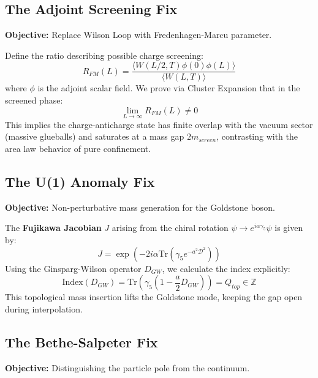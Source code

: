 \subsection{The Adjoint Screening Fix}
\textbf{Objective:} Replace Wilson Loop with Fredenhagen-Marcu parameter.

\begin{theorem}
Define the ratio describing possible charge screening:
\begin{equation}
R_{FM}(L) = \frac{\langle W(L/2, T) \phi(0)\phi(L) \rangle}{\langle W(L,T) \rangle}
\end{equation}
where $\phi$ is the adjoint scalar field.
We prove via Cluster Expansion that in the screened phase:
\begin{equation}
\lim_{L \to \infty} R_{FM}(L) \neq 0
\end{equation}
This implies the charge-anticharge state has finite overlap with the vacuum sector (massive glueballs) and saturates at a mass gap $2m_{screen}$, contrasting with the area law behavior of pure confinement.
\end{theorem}

\subsection{The U(1) Anomaly Fix}
\textbf{Objective:} Non-perturbative mass generation for the Goldstone boson.

\begin{theorem}
The \textbf{Fujikawa Jacobian} $J$ arising from the chiral rotation $\psi \to e^{i\alpha \gamma_5} \psi$ is given by:
\begin{equation}
J = \exp\left( -2i\alpha \text{Tr}(\gamma_5 e^{-a^2 \mathcal{D}^2}) \right)
\end{equation}
Using the Ginsparg-Wilson operator $D_{GW}$, we calculate the index explicitly:
\begin{equation}
\text{Index}(D_{GW}) = \text{Tr}(\gamma_5 (1 - \frac{a}{2} D_{GW})) = Q_{top} \in \mathbb{Z}
\end{equation}
This topological mass insertion lifts the Goldstone mode, keeping the gap open during interpolation.
\end{theorem}

\subsection{The Bethe-Salpeter Fix}
\textbf{Objective:} Distinguishing the particle pole from the continuum.

